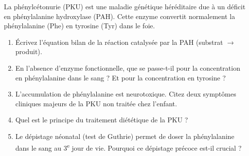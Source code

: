\documentclass[11pt]{article}
\begin{document}
\begin{exercice}
La phénylcétonurie (PKU) est une maladie génétique héréditaire due à un déficit en phénylalanine hydroxylase (PAH). Cette enzyme convertit normalement la phénylalanine (Phe) en tyrosine (Tyr) dans le foie.
\begin{enumerate}
    \item Écrivez l'équation bilan de la réaction catalysée par la PAH (substrat $\rightarrow$ produit).
    \item En l'absence d'enzyme fonctionnelle, que se passe-t-il pour la concentration en phénylalanine dans le sang ? Et pour la concentration en tyrosine ?
    \item L'accumulation de phénylalanine est neurotoxique. Citez deux symptômes cliniques majeurs de la PKU non traitée chez l'enfant.
    \item Quel est le principe du traitement diététique de la PKU ?
    \item Le dépistage néonatal (test de Guthrie) permet de doser la phénylalanine dans le sang au 3\textsuperscript{e} jour de vie. Pourquoi ce dépistage précoce est-il crucial ?
\end{enumerate}
\end{exercice}
\end{document}
